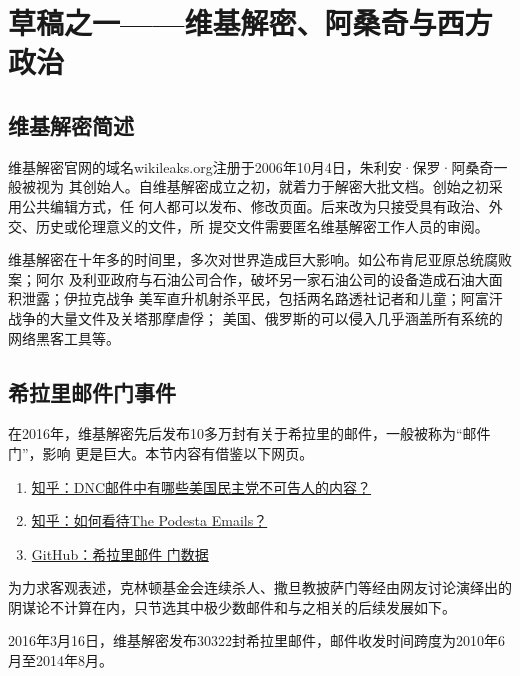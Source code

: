 
\chapter{草稿之一——维基解密、阿桑奇与西方政治}

\section{维基解密简述}
维基解密官网的域名wikileaks.org注册于2006年10月4日，朱利安·保罗·阿桑奇一般被视为
其创始人。自维基解密成立之初，就着力于解密大批文档。创始之初采用公共编辑方式，任
何人都可以发布、修改页面。后来改为只接受具有政治、外交、历史或伦理意义的文件，所
提交文件需要匿名维基解密工作人员的审阅。

维基解密在十年多的时间里，多次对世界造成巨大影响。如公布肯尼亚原总统腐败案；阿尔
及利亚政府与石油公司合作，破坏另一家石油公司的设备造成石油大面积泄露；伊拉克战争
美军直升机射杀平民，包括两名路透社记者和儿童；阿富汗战争的大量文件及关塔那摩虐俘；
美国、俄罗斯的可以侵入几乎涵盖所有系统的网络黑客工具等。

\section{希拉里邮件门事件}
在2016年，维基解密先后发布10多万封有关于希拉里的邮件，一般被称为“邮件门”，影响
更是巨大。本节内容有借鉴以下网页。
\begin{enumerate}
\item \href{https://www.zhihu.com/question/41676600}{知乎：DNC邮件中有哪些美国民主党不可告人的内容？}

\item \href{https://www.zhihu.com/question/51362588}{知乎：如何看待The Podesta Emails？}

\item \href{https://github.com/zhouningyi/us_selection_crack}{GitHub：希拉里邮件
    门数据}
\end{enumerate}


为力求客观表述，克林顿基金会连续杀人、撒旦教披萨门等经由网友讨论演绎出的
阴谋论不计算在内，只节选其中极少数邮件和与之相关的后续发展如下。

2016年3月16日，维基解密发布30322封希拉里邮件，邮件收发时间跨度为2010年6月至2014年8月。

